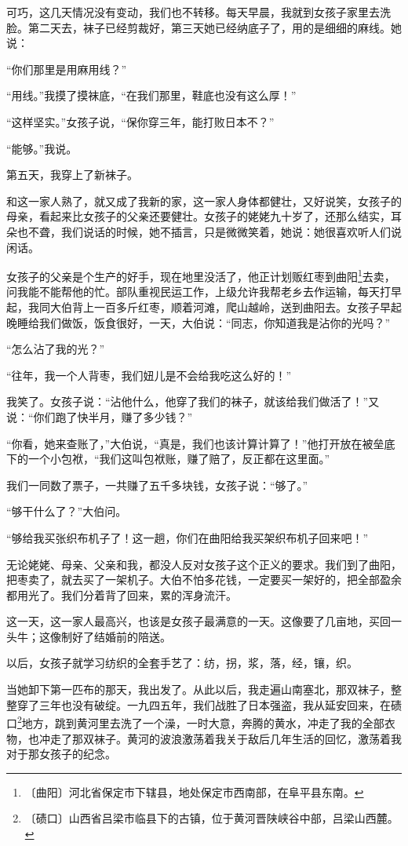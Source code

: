 \documentclass[12pt,UTF-8,openany]{ctexbook}
\begin{document}
\begin{large}
    可巧，这几天情况没有变动，我们也不转移。每天早晨，我就到女孩子家里去洗脸。第二天去，袜子已经剪裁好，第三天她已经纳底子了，用的是细细的麻线。她说：
    
    “你们那里是用麻用线？”
    
    “用线。”我摸了摸袜底，“在我们那里，鞋底也没有这么厚！”
    
    “这样坚实。”女孩子说，“保你穿三年，能打败日本不？”
    
    “能够。”我说。
    
    第五天，我穿上了新袜子。
    
    和这一家人熟了，就又成了我新的家，这一家人身体都健壮，又好说笑，女孩子的母亲，看起来比女孩子的父亲还要健壮。女孩子的姥姥九十岁了，还那么结实，耳朵也不聋，我们说话的时候，她不插言，只是微微笑着，她说：她很喜欢听人们说闲话。
    
    女孩子的父亲是个生产的好手，现在地里没活了，他正计划贩红枣到曲阳\footnote{〔曲阳〕河北省保定市下辖县，地处保定市西南部，在阜平县东南。}去卖，问我能不能帮他的忙。部队重视民运工作，上级允许我帮老乡去作运输，每天打早起，我同大伯背上一百多斤红枣，顺着河滩，爬山越岭，送到曲阳去。女孩子早起晚睡给我们做饭，饭食很好，一天，大伯说：“同志，你知道我是沾你的光吗？”
    
    “怎么沾了我的光？”
    
    “往年，我一个人背枣，我们妞儿是不会给我吃这么好的！”
    
    我笑了。女孩子说：“沾他什么，他穿了我们的袜子，就该给我们做活了！”又说：“你们跑了快半月，赚了多少钱？”
    
    “你看，她来查账了，”大伯说，“真是，我们也该计算计算了！”他打开放在被垒底下的一个小包袱，“我们这叫包袱账，赚了赔了，反正都在这里面。”
    
    我们一同数了票子，一共赚了五千多块钱，女孩子说：“够了。”
    
    “够干什么了？”大伯问。
    
    “够给我买张织布机子了！这一趟，你们在曲阳给我买架织布机子回来吧！”
    
    无论姥姥、母亲、父亲和我，都没人反对女孩子这个正义的要求。我们到了曲阳，把枣卖了，就去买了一架机子。大伯不怕多花钱，一定要买一架好的，把全部盈余都用光了。我们分着背了回来，累的浑身流汗。
    
    这一天，这一家人最高兴，也该是女孩子最满意的一天。这像要了几亩地，买回一头牛；这像制好了结婚前的陪送。
    
    以后，女孩子就学习纺织的全套手艺了：纺，拐，浆，落，经，镶，织。
    
    当她卸下第一匹布的那天，我出发了。从此以后，我走遍山南塞北，那双袜子，整整穿了三年也没有破绽。一九四五年，我们战胜了日本强盗，我从延安回来，在碛口\footnote{〔碛口〕山西省吕梁市临县下的古镇，位于黄河晋陕峡谷中部，吕梁山西麓。}地方，跳到黄河里去洗了一个澡，一时大意，奔腾的黄水，冲走了我的全部衣物，也冲走了那双袜子。黄河的波浪激荡着我关于敌后几年生活的回忆，激荡着我对于那女孩子的纪念。
    

\end{large}
\end{document}
